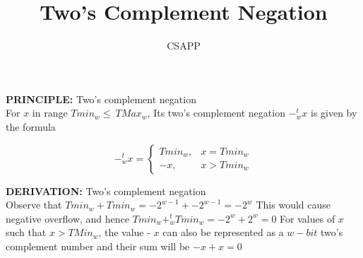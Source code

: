 \documentclass{article}
\title{Two's Complement Negation}
\author{CSAPP}
\begin{document}
    \maketitle
    \begin{flushleft}
        \textbf{\small PRINCIPLE:} Two's complement negation\\
        For $x$ in range $Tmin_w \leq \ TMax_w$, Its two's complement negation $-^t_wx$
        is given by the formula

        \[
            -^t_wx = {\begin{cases}
                Tmin_w, & x = Tmin_w\\
                -x, & x > Tmin_w
            \end{cases}}
        \]

        \textbf{\small DERIVATION:} Two's complement negation\\
        Observe that $Tmin_w + Tmin_w = -2^{w-1} + -2^{w-1} = -2^w$ This would cause
        negative overflow, and hence $Tmin_w + ^t_w Tmin_w = -2^w + 2^w = 0$ For values
        of $x$ such that $x > TMin_w$, the value - $x$ can also be represented as a $w-bit$ 
        two's complement number and their sum will be $-x+x = 0$
    \end{flushleft}
\end{document}
